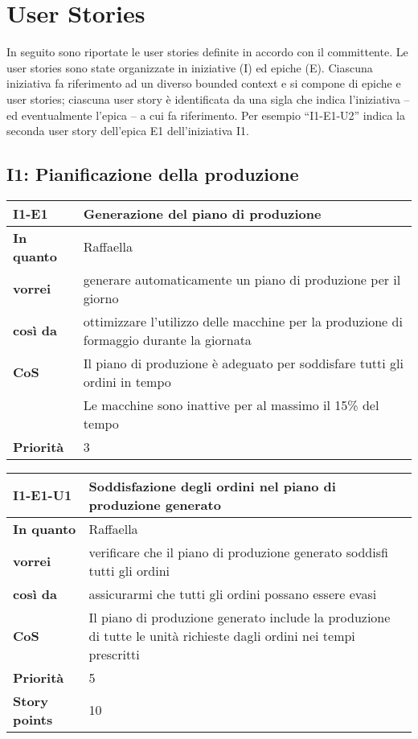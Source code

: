 \chapter{User Stories}
\label{app:user-stories}
In seguito sono riportate le user stories definite in accordo con il committente. Le user stories sono state organizzate in iniziative (I) ed epiche (E).
Ciascuna iniziativa fa riferimento ad un diverso bounded context e si compone di epiche e user stories; ciascuna user story è identificata da una sigla che indica l'iniziativa -- ed eventualmente l'epica -- a cui fa riferimento. Per esempio ``I1-E1-U2'' indica la seconda user story dell'epica E1 dell'iniziativa I1.

\section*{I1: Pianificazione della produzione}

\begin{table}[H]
  \begin{tabularx}{\textwidth}{lX}
    \toprule
    \textbf{I1-E1} & \textbf{Generazione del piano di produzione} \\
    \midrule
    \textbf{In quanto} & Raffaella \\
    \textbf{vorrei} & generare automaticamente un piano di produzione per il giorno \\
    \textbf{così da} & ottimizzare l'utilizzo delle macchine per la produzione di formaggio durante la giornata \\
    \midrule
    \textbf{CoS} & Il piano di produzione è adeguato per soddisfare tutti gli ordini in tempo \\
    & Le macchine sono inattive per al massimo il 15\% del tempo \\
    \midrule
    \textbf{Priorità} & 3 \\
    \bottomrule
  \end{tabularx}
  \label{user-story:i1-e1}
\end{table}

\begin{table}[H]
  \begin{tabularx}{\textwidth}{lX}
    \toprule
    \textbf{I1-E1-U1} & \textbf{Soddisfazione degli ordini nel piano di produzione generato} \\
    \midrule
    \textbf{In quanto} & Raffaella \\
    \textbf{vorrei} & verificare che il piano di produzione generato soddisfi tutti gli ordini \\
    \textbf{così da} & assicurarmi che tutti gli ordini possano essere evasi \\
    \midrule
    \textbf{CoS} & Il piano di produzione generato include la produzione di tutte le unità richieste dagli ordini nei tempi prescritti \\
    \midrule
    \textbf{Priorità} & 5 \\
    \textbf{Story points} & 10 \\
    \bottomrule
  \end{tabularx}
  \label{user-story:i1-e1-u1}
\end{table}

